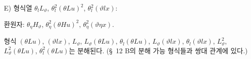 
\noindent E) 형식열 $\theta_lL_\vartheta$, $\theta_l^2(\theta Lu)^2$, $\theta_l^2(\vartheta lx)$:

환원자: $\theta_\eta H_\vartheta$, $\theta_\eta^2(\theta Hu)^2$, $\theta_\eta^2(\vartheta\eta x)$.

형식 $(\theta Lu)$, $(\vartheta lx)$, $L_\vartheta$, $L_\vartheta(\theta Lu)$, $\theta_l(\theta Lu)$, $L_\vartheta(\vartheta lx)$, $\theta_l(\vartheta lx)$, $L_\vartheta^2$, $L_\vartheta^2(\theta Lu)$, $\theta_l^2(\theta Lu)$는 분해된다. (\S\ 12 B의 분해 가능 형식들과 쌍대 관계에 있다.)
